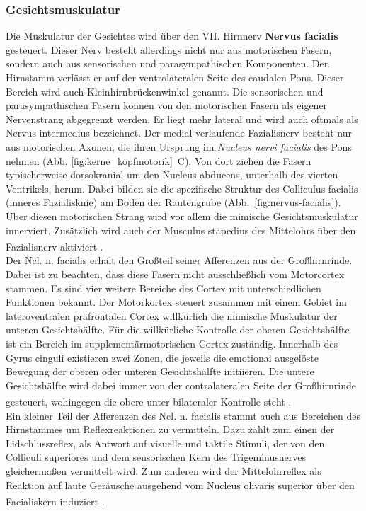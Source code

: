 \documentclass[12pt,a4paper,pdftex]{article}
\begin{document}
\subsubsection*{Gesichtsmuskulatur}
Die Muskulatur der Gesichtes wird über den VII. Hirnnerv \textbf{Nervus facialis}  gesteuert. Dieser Nerv besteht allerdings nicht nur aus motorischen Fasern, sondern auch aus sensorischen und parasympathischen Komponenten. Den Hirnstamm verlässt er auf der ventrolateralen Seite des caudalen Pons. Dieser Bereich wird auch Kleinhirnbrückenwinkel genannt. Die sensorischen und parasympathischen Fasern können von den motorischen Fasern als eigener Nervenstrang abgegrenzt werden. Er liegt mehr lateral und wird auch oftmals als Nervus intermedius bezeichnet. Der medial verlaufende Fazialisnerv besteht nur aus motorischen Axonen, die ihren Ursprung im \textit{Nucleus nervi facialis}  des Pons nehmen (Abb. \ref{fig:kerne_kopfmotorik}~C). Von dort ziehen die Fasern typischerweise dorsokranial um den Nucleus abducens, unterhalb des vierten Ventrikels, herum. Dabei bilden sie die spezifische Struktur des Colliculus facialis (inneres Fazialisknie) am Boden der Rautengrube (Abb.~\ref{fig:nervus-facialis}). Über diesen motorischen Strang wird vor allem die mimische Gesichtsmuskulatur innerviert. Zusätzlich wird auch der Musculus stapedius des Mittelohrs über den Fazialisnerv aktiviert \textsuperscript{\cite[10][5]{crossman2014neuroanatomy, trepel2011neuroanatomie}}. \\
Der Ncl. n. facialis erhält den Großteil seiner Afferenzen aus der Großhirnrinde. Dabei ist zu beachten, dass diese Fasern nicht ausschließlich vom Motorcortex stammen. Es sind vier weitere Bereiche des Cortex mit unterschiedlichen Funktionen bekannt. Der Motorkortex steuert zusammen mit einem Gebiet im lateroventralen präfrontalen Cortex willkürlich die mimische Muskulatur der unteren Gesichtshälfte. Für die willkürliche Kontrolle der oberen Gesichtshälfte ist ein Bereich im supplementärmotorischen Cortex zuständig. Innerhalb des Gyrus cinguli existieren zwei Zonen, die jeweils die emotional ausgelöste Bewegung der oberen oder unteren Gesichtshälfte initiieren. Die untere Gesichtshälfte wird dabei immer von der contralateralen Seite der Großhirnrinde gesteuert, wohingegen die obere unter bilateraler Kontrolle steht \textsuperscript{\cite[9]{trepel2011neuroanatomie}}. \\
Ein kleiner Teil der Afferenzen des Ncl. n. facialis stammt auch aus Bereichen des Hirnstammes um Reflexreaktionen zu vermitteln. Dazu zählt zum einen der Lidschlussreflex, als Antwort auf visuelle und taktile Stimuli, der von den Colliculi superiores und dem sensorischen Kern des Trigeminusnerves gleichermaßen vermittelt wird. Zum anderen wird der Mittelohrreflex als Reaktion auf laute Geräusche ausgehend vom Nucleus olivaris superior über den Facialiskern induziert \textsuperscript{\cite[10]{crossman2014neuroanatomy}}. \\
\end{document}
